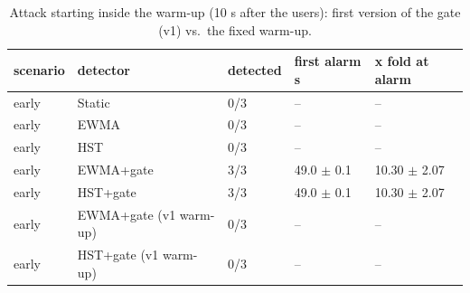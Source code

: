 \begin{table}[t]
\centering\small
\caption{Attack starting inside the warm-up (10 s after the users): first version of the gate (v1) vs.\ the fixed warm-up.}\label{tab:early}
\begin{tabular}{lllll}
\toprule
scenario & detector & detected & first alarm s & x fold at alarm \\
\midrule
early & Static & 0/3 & -- & -- \\
early & EWMA & 0/3 & -- & -- \\
early & HST & 0/3 & -- & -- \\
early & EWMA+gate & 3/3 & 49.0 $\pm$ 0.1 & 10.30 $\pm$ 2.07 \\
early & HST+gate & 3/3 & 49.0 $\pm$ 0.1 & 10.30 $\pm$ 2.07 \\
early & EWMA+gate (v1 warm-up) & 0/3 & -- & -- \\
early & HST+gate (v1 warm-up) & 0/3 & -- & -- \\
\bottomrule
\end{tabular}
\end{table}

